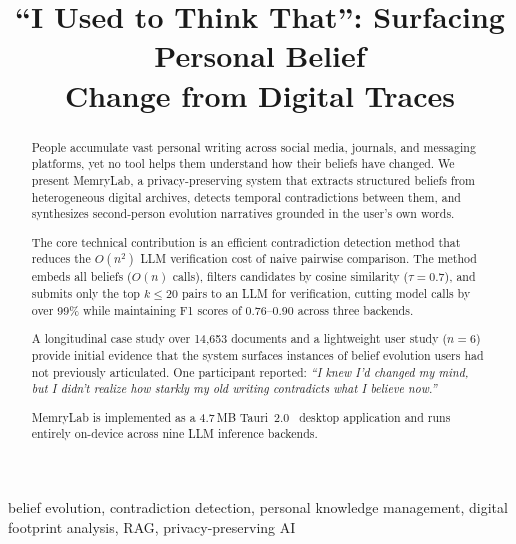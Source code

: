 \documentclass[conference]{IEEEtran}
\begin{document}
\title{``I Used to Think That'': Surfacing Personal Belief\\Change from Digital Traces}

\author{
}

\maketitle

\begin{abstract}
People accumulate vast personal writing across social media, journals, and messaging platforms, yet no tool helps them understand how their beliefs have changed. We present MemryLab, a privacy-preserving system that extracts structured beliefs from heterogeneous digital archives, detects temporal contradictions between them, and synthesizes second-person evolution narratives grounded in the user's own words.

The core technical contribution is an efficient contradiction detection method that reduces the $O(n^2)$ LLM verification cost of naive pairwise comparison. The method embeds all beliefs ($O(n)$ calls), filters candidates by cosine similarity ($\tau{=}0.7$), and submits only the top $k \leq 20$ pairs to an LLM for verification, cutting model calls by over 99\% while maintaining F1 scores of 0.76--0.90 across three backends.

A longitudinal case study over 14,653 documents and a lightweight user study ($n{=}6$) provide initial evidence that the system surfaces instances of belief evolution users had not previously articulated. One participant reported: \emph{``I knew I'd changed my mind, but I didn't realize how starkly my old writing contradicts what I believe now.''}

MemryLab is implemented as a 4.7\,MB Tauri~2.0~\cite{thompson2024tauri} desktop application and runs entirely on-device across nine LLM inference backends.
\end{abstract}

\begin{IEEEkeywords}
belief evolution, contradiction detection, personal knowledge management, digital footprint analysis, RAG, privacy-preserving AI
\end{IEEEkeywords}

\end{document}
